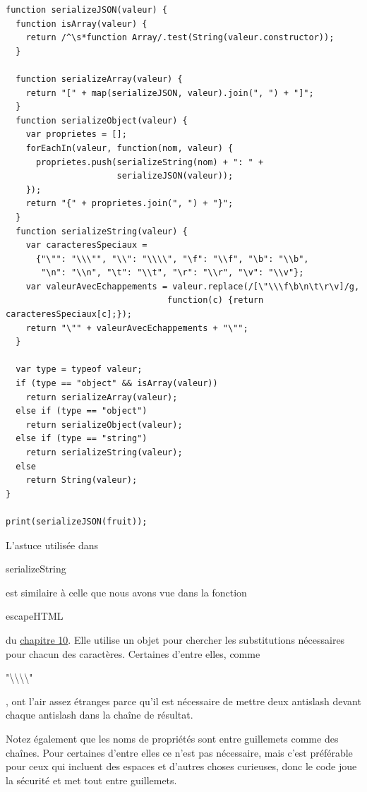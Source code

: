 \documentclass{FramateX}
\renewcommand{\texttt}[1]{\begin{sffamily}{#1}\end{sffamily}}
\begin{document}
\begin{lstlisting}
function serializeJSON(valeur) {
  function isArray(valeur) {
    return /^\s*function Array/.test(String(valeur.constructor));
  }

  function serializeArray(valeur) {
    return "[" + map(serializeJSON, valeur).join(", ") + "]";
  }
  function serializeObject(valeur) {
    var proprietes = [];
    forEachIn(valeur, function(nom, valeur) {
      proprietes.push(serializeString(nom) + ": " +
                      serializeJSON(valeur));
    });
    return "{" + proprietes.join(", ") + "}";
  }
  function serializeString(valeur) {
    var caracteresSpeciaux =
      {"\"": "\\\"", "\\": "\\\\", "\f": "\\f", "\b": "\\b",
       "\n": "\\n", "\t": "\\t", "\r": "\\r", "\v": "\\v"};
    var valeurAvecEchappements = valeur.replace(/[\"\\\f\b\n\t\r\v]/g,
                                function(c) {return caracteresSpeciaux[c];});
    return "\"" + valeurAvecEchappements + "\"";
  }

  var type = typeof valeur;
  if (type == "object" && isArray(valeur))
    return serializeArray(valeur);
  else if (type == "object")
    return serializeObject(valeur);
  else if (type == "string")
    return serializeString(valeur);
  else
    return String(valeur);
}

print(serializeJSON(fruit));
\end{lstlisting}
L'astuce utilisée dans \texttt{serializeString} est similaire à celle
que nous avons vue dans la fonction \texttt{escapeHTML} du
\href{chapter10.html}{chapitre 10}. Elle utilise un objet pour chercher
les substitutions nécessaires pour chacun des caractères. Certaines
d'entre elles, comme
\texttt{"\textbackslash{}\textbackslash{}\textbackslash{}\textbackslash{}"},
ont l'air assez étranges parce qu'il est nécessaire de mettre deux
antislash devant chaque antislash dans la chaîne de résultat.

Notez également que les noms de propriétés sont entre guillemets comme
des chaînes. Pour certaines d'entre elles ce n'est pas nécessaire, mais
c'est préférable pour ceux qui incluent des espaces et d'autres choses
curieuses, donc le code joue la sécurité et met tout entre guillemets.
\end{document}
